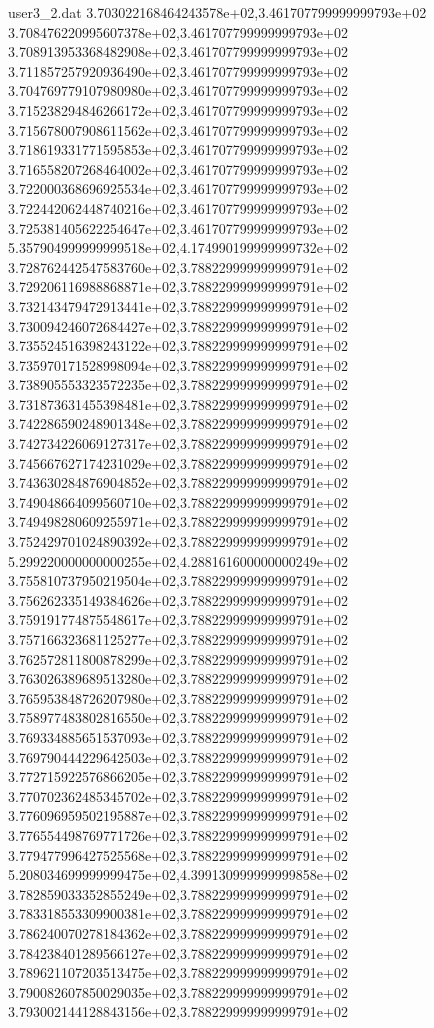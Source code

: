 \begin{filecontents}{user3_2.dat}
3.703022168464243578e+02,3.461707799999999793e+02
3.708476220995607378e+02,3.461707799999999793e+02
3.708913953368482908e+02,3.461707799999999793e+02
3.711857257920936490e+02,3.461707799999999793e+02
3.704769779107980980e+02,3.461707799999999793e+02
3.715238294846266172e+02,3.461707799999999793e+02
3.715678007908611562e+02,3.461707799999999793e+02
3.718619331771595853e+02,3.461707799999999793e+02
3.716558207268464002e+02,3.461707799999999793e+02
3.722000368696925534e+02,3.461707799999999793e+02
3.722442062448740216e+02,3.461707799999999793e+02
3.725381405622254647e+02,3.461707799999999793e+02
5.357904999999999518e+02,4.174990199999999732e+02
3.728762442547583760e+02,3.788229999999999791e+02
3.729206116988868871e+02,3.788229999999999791e+02
3.732143479472913441e+02,3.788229999999999791e+02
3.730094246072684427e+02,3.788229999999999791e+02
3.735524516398243122e+02,3.788229999999999791e+02
3.735970171528998094e+02,3.788229999999999791e+02
3.738905553323572235e+02,3.788229999999999791e+02
3.731873631455398481e+02,3.788229999999999791e+02
3.742286590248901348e+02,3.788229999999999791e+02
3.742734226069127317e+02,3.788229999999999791e+02
3.745667627174231029e+02,3.788229999999999791e+02
3.743630284876904852e+02,3.788229999999999791e+02
3.749048664099560710e+02,3.788229999999999791e+02
3.749498280609255971e+02,3.788229999999999791e+02
3.752429701024890392e+02,3.788229999999999791e+02
5.299220000000000255e+02,4.288161600000000249e+02
3.755810737950219504e+02,3.788229999999999791e+02
3.756262335149384626e+02,3.788229999999999791e+02
3.759191774875548617e+02,3.788229999999999791e+02
3.757166323681125277e+02,3.788229999999999791e+02
3.762572811800878299e+02,3.788229999999999791e+02
3.763026389689513280e+02,3.788229999999999791e+02
3.765953848726207980e+02,3.788229999999999791e+02
3.758977483802816550e+02,3.788229999999999791e+02
3.769334885651537093e+02,3.788229999999999791e+02
3.769790444229642503e+02,3.788229999999999791e+02
3.772715922576866205e+02,3.788229999999999791e+02
3.770702362485345702e+02,3.788229999999999791e+02
3.776096959502195887e+02,3.788229999999999791e+02
3.776554498769771726e+02,3.788229999999999791e+02
3.779477996427525568e+02,3.788229999999999791e+02
5.208034699999999475e+02,4.399130999999999858e+02
3.782859033352855249e+02,3.788229999999999791e+02
3.783318553309900381e+02,3.788229999999999791e+02
3.786240070278184362e+02,3.788229999999999791e+02
3.784238401289566127e+02,3.788229999999999791e+02
3.789621107203513475e+02,3.788229999999999791e+02
3.790082607850029035e+02,3.788229999999999791e+02
3.793002144128843156e+02,3.788229999999999791e+02

\end{filecontents}
